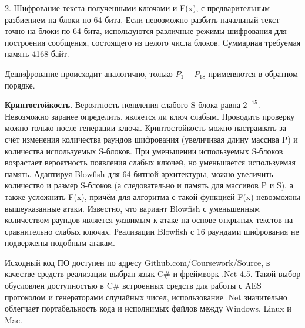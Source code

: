 2. Шифрование текста полученными ключами и F(x), с предварительным разбиением на блоки по 64 бита. Если невозможно разбить начальный текст точно на блоки по 64 бита, используются различные режимы шифрования для построения сообщения, состоящего из целого числа блоков. Суммарная требуемая память 4168 байт.

Дешифрование происходит аналогично, только  $ P_{1}-P_{18}  $ применяются в обратном порядке. 

\textbf{Криптостойкость}. Вероятность появления слабого S-блока равна   $ 2^{-15} $. Невозможно заранее определить, является ли ключ слабым. Проводить проверку можно только после генерации ключа.  Криптостойкость можно настраивать за счёт изменения количества раундов шифрования (увеличивая длину массива P) и количества используемых S-блоков. При уменьшении используемых S-блоков возрастает вероятность появления слабых ключей, но уменьшается используемая память. Адаптируя Blowfish для 64-битной архитектуры, можно увеличить количество и размер S-блоков (а следовательно и память для массивов P и S), а также усложнить F(x), причём для алгоритма с такой функцией F(x) невозможны вышеуказанные атаки. Известно, что вариант Blowfish с уменьшенным количеством раундов является уязвимым к атаке на основе открытых текстов на сравнительно слабых ключах. Реализации Blowfish с 16 раундами шифрования не подвержены подобным атакам.

Исходный код ПО доступен по адресу Github.com/Coursework/Source, в качестве средств реализации выбран язык C\# и фреймворк .Net 4.5. Такой выбор обусловлен доступностью в C\# встроенных средств для работы с AES протоколом и генераторами случайных чисел, использование .Net значительно облегчает портабельность кода и исполнимых файлов между Windows, Linux и Mac.
\newpage
